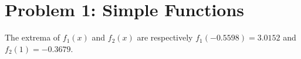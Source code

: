 \section{Problem 1: Simple Functions}
The extrema of $f_1(x)$ and $f_2(x)$ are respectively $f_1(-0.5598)=3.0152$ and $f_2(1)=-0.3679$.
